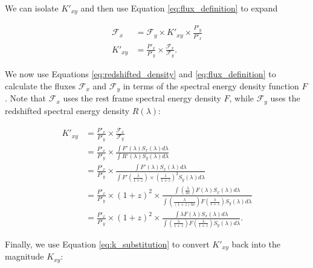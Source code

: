 \documentclass[aps,prl,reprint,amsmath]{revtex4-2}
\begin{document}
\noindent We can isolate $K'_{xy}$ and then use Equation \ref{eq:flux_definition} to expand

\begin{equation}
\begin{aligned}
  \mathcal{F}_x &= \mathcal{F}_y \times K'_{xy} \times \frac{P'_y}{P'_x} \\
        K'_{xy} &= \frac{P'_x}{P'_y} \times \frac{\mathcal{F}_x}{\mathcal{F}_y} .
\end{aligned}
\end{equation}

\noindent We now use Equations \ref{eq:redshifted_density} and \ref{eq:flux_definition}
to calculate the fluxes $\mathcal{F}_x$ and $\mathcal{F}_y$ in terms of the
spectral energy density function $F$. Note that $\mathcal{F}_x$ uses the rest
frame spectral energy density $F$, while $\mathcal{F}_y$ uses the redshifted
spectral energy density $R(\lambda)$:

\begin{equation}
\begin{aligned}
  K'_{xy} &= \frac{P'_x}{P'_y} \times \frac{\mathcal{F}_x}{\mathcal{F}_y} \\
         &= \frac{P'_x}{P'_y} \times
              \frac{\int F'(\lambda) S_x(\lambda) d\lambda}
                   {\int R'(\lambda) S_y(\lambda) d\lambda} \\
         &= \frac{P'_x}{P'_y} \times
              \frac{\int F'(\lambda) S_x(\lambda) d\lambda}
                   {\int F'\left(\frac{\lambda}{1+z}\right) \times \left(\frac{1}{1 + z}\right)^2 S_y(\lambda) d\lambda} \\
         &= \frac{P'_x}{P'_y} \times (1+z)^2 \times
              \frac{\int \left(\frac{\lambda}{hc}\right) F(\lambda) S_x(\lambda) d\lambda}
                   {\int \left(\frac{\lambda}{(1+z)hc}\right) F\left(\frac{\lambda}{1+z}\right) S_y(\lambda) d\lambda} \\
         &= \frac{P'_x}{P'_y} \times (1 + z)^2 \times
              \frac{\int \lambda F(\lambda) S_x(\lambda) d\lambda}
                   {\int \left(\frac{\lambda}{1+z}\right) F\left(\frac{\lambda}{1+z}\right) S_y(\lambda) d\lambda} .
\end{aligned}
\end{equation}

Finally, we use Equation \ref{eq:k_substitution} to convert $K'_{xy}$ back into
the magnitude $K_{xy}$:
\end{document}
